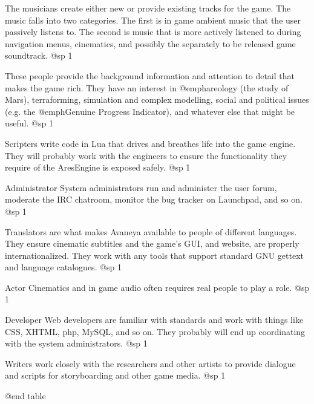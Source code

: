 \itemMusician
The musicians create either new or provide existing tracks for the game. The music falls into two categories. The first is in game ambient music that the user passively listens to. The second is music that is more actively listened to during navigation menus, cinematics, and possibly the separately to be released game soundtrack.
@sp 1

\itemResearcher
These people provide the background information and attention to detail that makes the game rich. They have an interest in @emph{areology} (the study of Mars), terraforming, simulation and complex modelling, social and political issues (e.g. the @emph{Genuine Progress Indicator}), and whatever else that might be useful.
@sp 1

\itemScripter
Scripters write code in Lua that drives and breathes life into the game engine. They will probably work with the engineers to ensure the functionality they require of the AresEngine is exposed safely.
@sp 1

\itemSystem Administrator
System administrators run and administer the user forum, moderate the IRC chatroom, monitor the bug tracker on Launchpad, and so on.
@sp 1

\itemTranslator
Translators are what makes Avaneya available to people of different languages. They ensure cinematic subtitles and the game's GUI, and website, are properly internationalized. They work with any tools that support standard GNU gettext and language catalogues.
@sp 1

\itemVoice Actor
Cinematics and in game audio often requires real people to play a role.
@sp 1

\itemWeb Developer
Web developers are familiar with standards and work with things like CSS, XHTML, php, MySQL, and so on. They probably will end up coordinating with the system administrators.
@sp 1

\itemWriter
Writers work closely with the researchers and other artists to provide dialogue and scripts for storyboarding and other game media.
@sp 1

@end table

